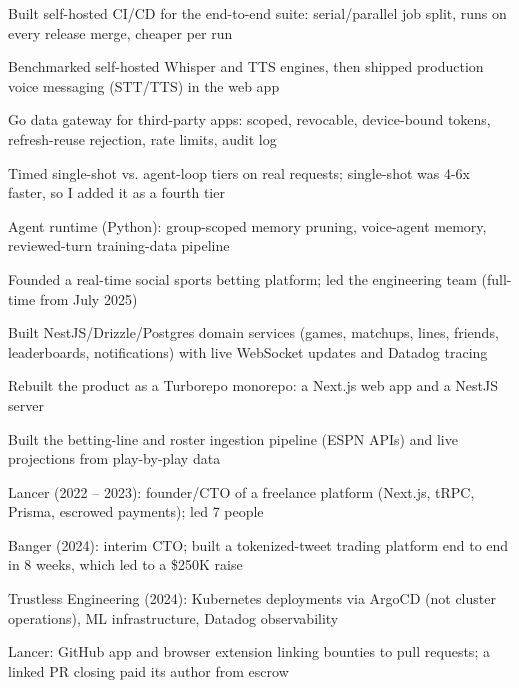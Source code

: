 \documentclass[print]{jack-resume}
\begin{document}
\begin{tightemize}
    \item Built self-hosted CI/CD for the end-to-end suite: serial/parallel job split, runs on every release merge, cheaper per run
    \item Benchmarked self-hosted Whisper and TTS engines, then shipped production voice messaging (STT/TTS) in the web app
    \item Go data gateway for third-party apps: scoped, revocable, device-bound tokens, refresh-reuse rejection, rate limits, audit log
    \item Timed single-shot vs. agent-loop tiers on real requests; single-shot was 4-6x faster, so I added it as a fourth tier
    \item Agent runtime (Python): group-scoped memory pruning, voice-agent memory, reviewed-turn training-data pipeline
\end{tightemize}
\sectionsep

\begin{tightemize}
    \item Founded a real-time social sports betting platform; led the engineering team (full-time from July 2025)
    \item Built NestJS/Drizzle/Postgres domain services (games, matchups, lines, friends, leaderboards, notifications) with live WebSocket updates and Datadog tracing
    \item Rebuilt the product as a Turborepo monorepo: a Next.js web app and a NestJS server
    \item Built the betting-line and roster ingestion pipeline (ESPN APIs) and live projections from play-by-play data
\end{tightemize}
\sectionsep

\begin{tightemize}
    \item Lancer (2022 -- 2023): founder/CTO of a freelance platform (Next.js, tRPC, Prisma, escrowed payments); led 7 people
    \item Banger (2024): interim CTO; built a tokenized-tweet trading platform end to end in 8 weeks, which led to a \$250K raise
    \item Trustless Engineering (2024): Kubernetes deployments via ArgoCD (not cluster operations), ML infrastructure, Datadog observability
    \item Lancer: GitHub app and browser extension linking bounties to pull requests; a linked PR closing paid its author from escrow
\end{tightemize}
\sectionsep
\end{document}
